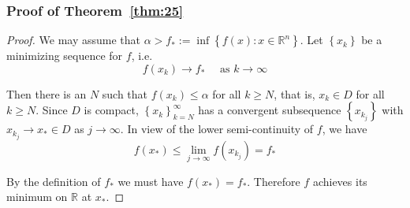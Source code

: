 \subsubsection{Proof of Theorem~\ref{thm:25}}
\label{appendix:thm25}
\begin{proof}
We may assume that $\alpha>f_{*}:=\inf \left\{f(x): x \in \mathbb{R}^{n}\right\}$. Let $\left\{x_{k}\right\}$ be a minimizing sequence for $f$, i.e.
$$
f\left(x_{k}\right) \rightarrow f_{*} \quad \textrm { as }  k \rightarrow \infty
$$
\par Then there is an $N$ such that $f(x_k) \leq \alpha$ for all $k \geq N$, that is, $x_k \in D$ for all $k \geq N$. Since $D$ is compact, $\left\{x_{k}\right\}_{k=N}^{\infty}$ has a convergent subsequence $\left\{x_{k_j}\right\}$ with $x_{k_{j}} \rightarrow x_{*} \in D$ as $j \rightarrow \infty$. In view of the lower semi-continuity of $f$, we have
$$
f\left(x_{*}\right) \leq \lim _{j \rightarrow \infty} f\left(x_{k_{j}}\right)=f_{*}
$$
\par By the definition of $f_*$ we must have $f(x_{*}) = f_*$. Therefore $f$ achieves its minimum on $\mathbb{R}$ at $x_{*}$.  
\end{proof}
